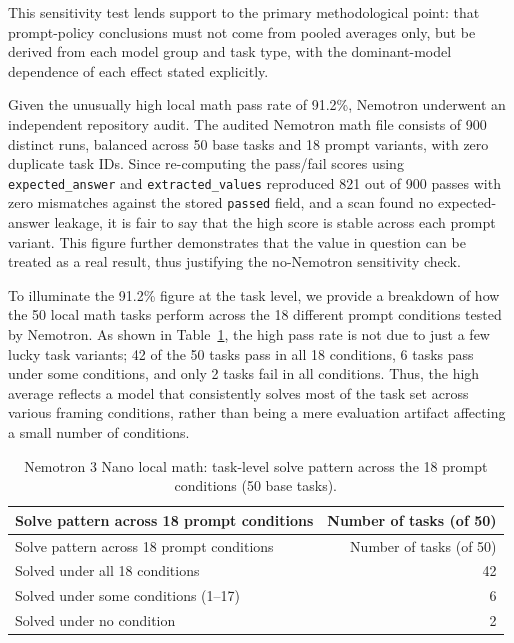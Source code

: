 This sensitivity test lends support to the primary methodological point: that prompt-policy conclusions must not come from pooled averages only, but be derived from each model group and task type, with the dominant-model dependence of each effect stated explicitly.

Given the unusually high local math pass rate of 91.2\%, Nemotron underwent an independent repository audit. The audited Nemotron math file consists of 900 distinct runs, balanced across 50 base tasks and 18 prompt variants, with zero duplicate task IDs. Since re-computing the pass/fail scores using \texttt{expected\_answer} and \texttt{extracted\_values} reproduced 821 out of 900 passes with zero mismatches against the stored \texttt{passed} field, and a scan found no expected-answer leakage, it is fair to say that the high score is stable across each prompt variant. This figure further demonstrates that the value in question can be treated as a real result, thus justifying the no-Nemotron sensitivity check.

To illuminate the 91.2\% figure at the task level, we provide a breakdown of how the 50 local math tasks perform across the 18 different prompt conditions tested by Nemotron. As shown in Table~\ref{tab:nemotron-task-summary}, the high pass rate is not due to just a few lucky task variants; 42 of the 50 tasks pass in all 18 conditions, 6 tasks pass under some conditions, and only 2 tasks fail in all conditions. Thus, the high average reflects a model that consistently solves most of the task set across various framing conditions, rather than being a mere evaluation artifact affecting a small number of conditions.

\begin{longtable}[]{@{}lr@{}}
\caption{Nemotron 3 Nano local math: task-level solve pattern across the 18 prompt conditions (50 base tasks).}\label{tab:nemotron-task-summary}\tabularnewline
\toprule\noalign{}
Solve pattern across 18 prompt conditions & Number of tasks (of 50) \\
\midrule\noalign{}
\endfirsthead
\toprule\noalign{}
Solve pattern across 18 prompt conditions & Number of tasks (of 50) \\
\midrule\noalign{}
\endhead
\bottomrule\noalign{}
\endlastfoot
Solved under all 18 conditions & 42 \\
Solved under some conditions (1--17) & 6 \\
Solved under no condition & 2 \\
\end{longtable}

